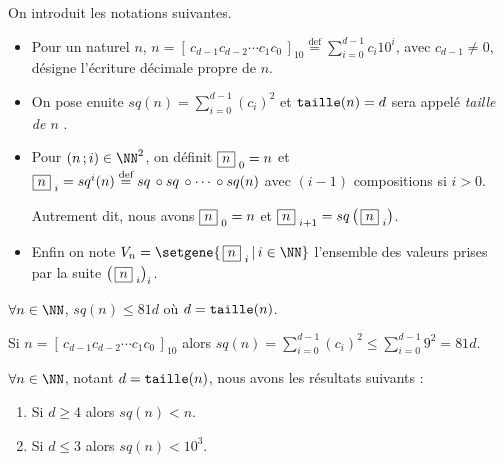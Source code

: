 On introduit les notations suivantes.
\begin{itemize}[label = \textbullet]
	\item Pour un naturel $n$,
	$\displaystyle      n =  \left[ \, c_{d-1} c_{d-2} \cdots c_1 c_0 \, \right]_{10} 
	\stackrel{\text{def}}{=} \sum_{i=0}^{d-1} c_i 10^i$,
	avec $c_{d-1} \neq 0$, désigne l'écriture décimale propre de $n$.
	
	\item On pose enuite
	$\displaystyle sq(n) = \sum_{i=0}^{d-1} (c_i)^2$
	et
	$\operatorname{\text{\normalfont\texttt{taille}}}(n) = d$ sera appelé \emph{\og taille de $n$ \fg}.


	\item Pour $(n \,; i) \in \NN^2$, on définit 
	$  \fbox{$n$}_{\,\,0} = n$
	et
	$  \fbox{$n$}_{\,\,i} = sq^i(n)
	\stackrel{\text{def}}{=} sq \,\circ sq \,\circ \cdots \,\circ sq(n)$ avec $(i-1)$ compositions si $i > 0$.
	
	
	\smallskip\noindent
	Autrement dit, nous avons
	$\fbox{$n$}_{\,\,0} = n$
	et
	$\fbox{$n$}_{\,\,i+1} = sq \left( \, \fbox{$n$}_{\,\,i} \right)$.


	\item Enfin on note
	$V_n = \setgene{ \, \sqseq{n}{i} \, | \, i \in \NN }$
	l'ensemble des valeurs prises par la suite $\left( \, \fbox{$n$}_{\,\,i} \right)_i$.
\end{itemize}



\bigskip

\begin{fact}
	$\forall n \in \NN$, $sq(n) \leqslant 81 d$ où $d = \operatorname{\text{\normalfont\texttt{taille}}}(n)$.
\end{fact}

\begin{proof*}
	Si $n = \left[ \, c_{d-1} c_{d-2} \cdots c_1 c_0 \, \right]_{10}$
	alors 
	$\displaystyle sq(n) = \sum_{i=0}^{d-1} (c_i)^2 \leqslant \sum_{i=0}^{d-1} 9^2 = 81 d $.
\end{proof*}




\medskip

\begin{fact}\label{magicmajo}
	$\forall n \in \NN$, notant $d = \operatorname{\text{\normalfont\texttt{taille}}}(n)$, nous avons les résultats suivants :
	
	\begin{enumerate}
		\item Si $d \geqslant 4$ alors $sq(n) < n$.
		
		\item Si $d \leqslant 3$ alors $sq(n) < 10^3$.
	\end{enumerate}
\end{fact}

